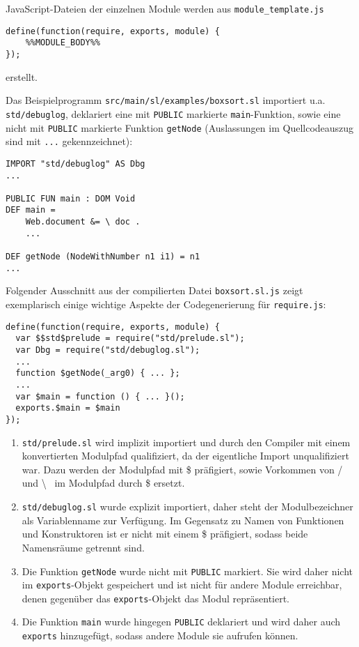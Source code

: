 \documentclass[runningheads]{llncs}
\begin{document}
JavaScript-Dateien der einzelnen Module werden aus
\texttt{module\_template.js}

\begin{verbatim}
define(function(require, exports, module) {
    %%MODULE_BODY%%
});
\end{verbatim}

erstellt.

Das Beispielprogramm \texttt{src/main/sl/examples/boxsort.sl}
importiert u.a. \texttt{std/debuglog}, deklariert eine mit \texttt{PUBLIC}
markierte \texttt{main}-Funktion, sowie eine nicht mit \texttt{PUBLIC}
markierte Funktion \texttt{getNode} (Auslassungen im Quellcodeauszug sind
mit \texttt{...} gekennzeichnet):

\begin{verbatim}
IMPORT "std/debuglog" AS Dbg
...

PUBLIC FUN main : DOM Void
DEF main = 
    Web.document &= \ doc .
    ...
    
DEF getNode (NodeWithNumber n1 i1) = n1
...
\end{verbatim}

Folgender Ausschnitt aus der compilierten Datei \texttt{boxsort.sl.js}
zeigt exemplarisch einige wichtige Aspekte der Codegenerierung für
\texttt{require.js}:

\begin{verbatim}
define(function(require, exports, module) {
  var $$std$prelude = require("std/prelude.sl");
  var Dbg = require("std/debuglog.sl");
  ...
  function $getNode(_arg0) { ... };
  ...
  var $main = function () { ... }();
  exports.$main = $main
});
\end{verbatim}

\begin{enumerate}
\item \texttt{std/prelude.sl} wird implizit importiert und durch den
    Compiler mit einem konvertierten Modulpfad qualifiziert, da der
    eigentliche Import unqualifiziert war. Dazu werden der Modulpfad
    mit \$ präfigiert, sowie Vorkommen von / und \textbackslash ~ im Modulpfad
    durch \$ ersetzt.
\item \texttt{std/debuglog.sl} wurde explizit importiert, daher steht
    der Modulbezeichner als Variablenname zur Verfügung. Im Gegensatz
    zu Namen von Funktionen und Konstruktoren ist er nicht mit einem
    \$ präfigiert, sodass beide Namensräume getrennt sind.
\item Die Funktion \texttt{getNode} wurde nicht mit \texttt{PUBLIC} markiert.
    Sie wird daher nicht im \texttt{exports}-Objekt gespeichert und ist
    nicht für andere Module erreichbar, denen gegenüber das
    \texttt{exports}-Objekt das Modul repräsentiert.
\item Die Funktion \texttt{main} wurde hingegen \texttt{PUBLIC}
    deklariert und wird daher auch \texttt{exports} hinzugefügt, sodass
    andere Module sie aufrufen können.
\end{enumerate}
\end{document}
